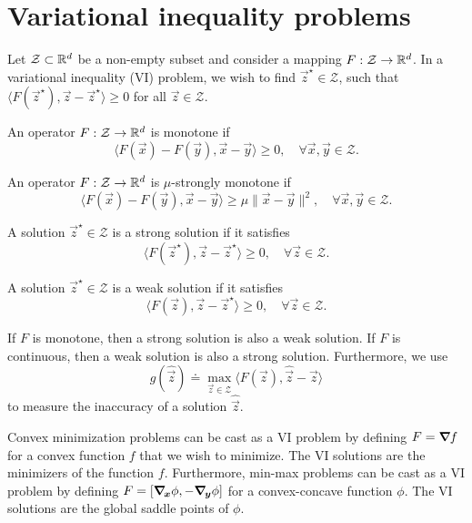 \section{Variational inequality problems}

Let $\mathcal{Z} \subset \mathbb{R}^d$ be a non-empty subset and consider a mapping $F: \mathcal{Z} \to
    \mathbb{R}^d$. In a variational inequality (VI) problem, we wish to find $\vec{z}^\star \in \mathcal{Z}$,
such that $\langle F(\vec{z}^\star), \vec{z} - \vec{z}^\star \rangle \geq 0$ for all $\vec{z} \in
    \mathcal{Z}$.

\begin{definition}
    An operator $F: \mathcal{Z} \to \mathbb{R}^d$ is monotone if \[
        \langle F(\vec{x}) - F(\vec{y}), \vec{x} - \vec{y} \rangle \geq 0, \quad \forall \vec{x}, \vec{y} \in \mathcal{Z}.
    \]
\end{definition}

\begin{definition}
    An operator $F: \mathcal{Z} \to \mathbb{R}^d$ is $\mu$-strongly monotone if \[
        \langle F(\vec{x}) - F(\vec{y}), \vec{x} - \vec{y} \rangle \geq \mu \| \vec{x} - \vec{y} \|^2, \quad \forall \vec{x}, \vec{y} \in \mathcal{Z}.
    \]
\end{definition}

\begin{definition}
    A solution $\vec{z}^\star \in \mathcal{Z}$ is a strong solution if it satisfies \[
        \langle F(\vec{z}^\star), \vec{z} - \vec{z}^\star \rangle \geq 0, \quad \forall \vec{z} \in \mathcal{Z}.
    \]
\end{definition}

\begin{definition}
    A solution $\vec{z}^\star \in \mathcal{Z}$ is a weak solution if it satisfies \[
        \langle F(\vec{z}), \vec{z} - \vec{z}^\star \rangle \geq 0, \quad \forall \vec{z} \in \mathcal{Z}.
    \]
\end{definition}

If $F$ is monotone, then a strong solution is also a weak solution. If $F$ is continuous, then a
weak solution is also a strong solution. Furthermore, we use \[
    g(\hat{\vec{z}}) \doteq \max_{\vec{z} \in \mathcal{Z}} \langle F(\vec{z}), \hat{\vec{z}} - \vec{z} \rangle
\]
to measure the inaccuracy of a solution $\hat{\vec{z}}$.

Convex minimization problems can be cast as a VI problem by defining $F = \bm{\nabla}_{\! } f$ for a convex
function $f$ that we wish to minimize. The VI solutions are the minimizers of the function $f$.
Furthermore, min-max problems can be cast as a VI problem by defining $F = [\bm{\nabla}_{\! \bm{x}} \phi,
    -\bm{\nabla}_{\! \bm{y}} \phi]$ for a convex-concave function $\phi$. The VI solutions are the global
saddle points of $\phi$.

